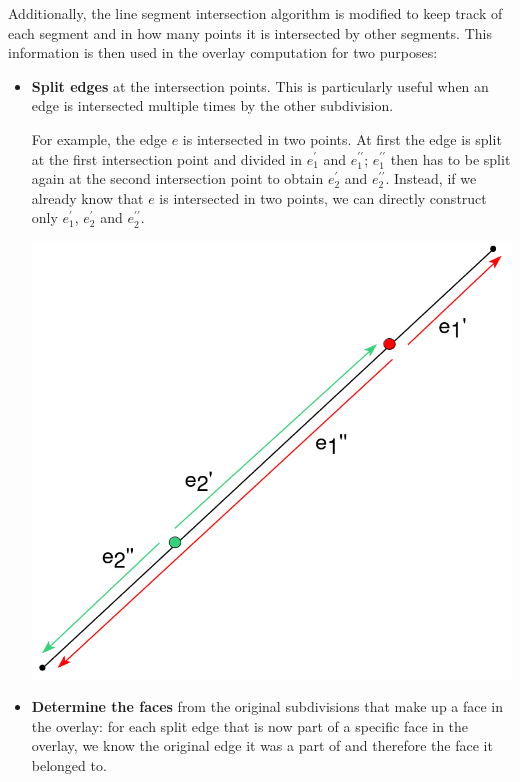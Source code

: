 Additionally, the line segment intersection algorithm is modified to keep track of each segment and in how many points it is intersected by other segments. This information is then used in the overlay computation for two purposes:
\begin{itemize}
    \item \textbf{Split edges} at the intersection points. This is particularly useful when an edge is intersected multiple times by the other subdivision.
          \hfill \break
          \begin{minipage}{0.7\linewidth}
              For example, the edge $e$ is intersected in two points. At first the edge is split at the first intersection point and divided in $e_1^{\prime}$ and $e_1^{\prime\prime}$; $e_1^{\prime\prime}$ then has to be split again at the second intersection point to obtain $e_2^{\prime}$ and $e_2^{\prime\prime}$. Instead, if we already know that $e$ is intersected in two points, we can directly construct only $e_1^{\prime}$, $e_2^{\prime}$ and $e_2^{\prime\prime}$.
          \end{minipage}
          \begin{minipage}{0.3\linewidth}
              \includegraphics[width=\linewidth]{images/split.png}
          \end{minipage}
    \item \textbf{Determine the faces} from the original subdivisions that make up a face in the overlay: for each split edge that is now part of a specific face in the overlay, we know the original edge it was a part of and therefore the face it belonged to.
\end{itemize}

